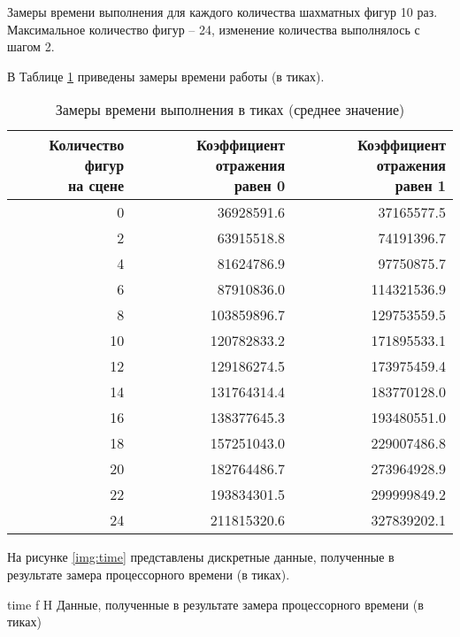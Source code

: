 Замеры времени выполнения для каждого количества шахматных фигур 10 раз. 
Максимальное количество фигур -- 24, изменение количества выполнялось с шагом 2. 

В Таблице \ref{tab:time} приведены замеры времени работы (в тиках).

\begin{table}[H]
	\centering
	\caption{\label{tab:time}Замеры времени выполнения в тиках (среднее значение)}
	\scalebox{0.75}
	{
		\begin{tabular}{|r|r|r|}
			\hline \specialcell{Количество фигур \\ на сцене} & 
			\specialcell{Коэффициент отражения \\ равен 0} &	\specialcell{Коэффициент отражения \\ равен 1} \\\hline
   \num{0} & \num{36928591.6}  & \num{37165577.5}  \\\hline
\num{2} & \num{63915518.8}  & \num{74191396.7}  \\\hline
\num{4} & \num{81624786.9}  & \num{97750875.7}  \\\hline
\num{6} & \num{87910836.0}  & \num{114321536.9}  \\\hline
\num{8} & \num{103859896.7}  & \num{129753559.5}  \\\hline
\num{10} & \num{120782833.2}  & \num{171895533.1}  \\\hline
\num{12} & \num{129186274.5}  & \num{173975459.4}  \\\hline
\num{14} & \num{131764314.4}  & \num{183770128.0}  \\\hline
\num{16} & \num{138377645.3}  & \num{193480551.0}  \\\hline
\num{18} & \num{157251043.0}  & \num{229007486.8}  \\\hline
\num{20} & \num{182764486.7}  & \num{273964928.9}  \\\hline
\num{22} & \num{193834301.5}  & \num{299999849.2}  \\\hline
\num{24} & \num{211815320.6}  & \num{327839202.1}  \\\hline
		\end{tabular}
	}
\end{table}

На рисунке \ref{img:time} представлены дискретные данные, полученные в результате замера процессорного времени (в тиках).

{time} 
{f} 
{H} 
{\textwidth} 
{Данные, полученные в результате замера процессорного времени (в тиках)}

